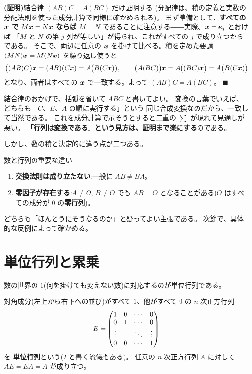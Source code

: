 \noindent\textbf{(証明)}\quad 結合律 $(AB)C = A(BC)$ だけ証明する
(分配律は、積の定義と実数の分配法則を使った成分計算で同様に確かめられる)。
まず準備として、\textbf{すべての $\bm{x}$ で $M\bm{x} = N\bm{x}$ ならば
$M = N$} であることに注意する――実際、$\bm{x} = \bm{e}_j$ とおけば
「$M$ と $N$ の第 $j$ 列が等しい」が得られ、これがすべての $j$ で成り立つからである。
そこで、両辺に任意の $\bm{x}$ を掛けて比べる。積を定めた要請
$(MN)\bm{x} = M(N\bm{x})$ を繰り返し使うと
\[
\bigl((AB)C\bigr)\bm{x} = (AB)(C\bm{x}) = A\bigl(B(C\bm{x})\bigr),
\qquad
\bigl(A(BC)\bigr)\bm{x} = A\bigl((BC)\bm{x}\bigr) = A\bigl(B(C\bm{x})\bigr)
\]
となり、両者はすべての $\bm{x}$ で一致する。よって $(AB)C = A(BC)$。 $\blacksquare$

結合律のおかげで、括弧を省いて $ABC$ と書いてよい。
変換の言葉でいえば、どちらも「$C$、$B$、$A$ の順に実行する」という
同じ合成変換なのだから、一致して当然である。
これを成分計算で示そうとすると二重の $\sum$ が現れて見通しが悪い。
\textbf{「行列は変換である」という見方は、証明まで楽にする}のである。

しかし、数の積と決定的に違う点が二つある。

\begin{itembox}[l]{数と行列の重要な違い}
\begin{enumerate}
\item \textbf{交換法則は成り立たない}:一般に $AB \neq BA$。
\item \textbf{零因子が存在する}:$A \neq O$, $B \neq O$ でも $AB = O$
となることがある($O$ はすべての成分が $0$ の\textbf{零行列})。
\end{enumerate}
\end{itembox}

どちらも「ほんとうにそうなるのか」と疑ってよい主張である。
次節で、具体的な反例によって確かめる。

\section{単位行列と累乗}

数の世界の $1$(何を掛けても変えない数)に対応するのが単位行列である。

\begin{teigi}[単位行列]
対角成分(左上から右下への並び)がすべて $1$、他がすべて $0$ の
$n$ 次正方行列
\[
E = \begin{pmatrix}1 & 0 & \cdots & 0 \\ 0 & 1 & \cdots & 0 \\
\vdots & & \ddots & \vdots \\ 0 & 0 & \cdots & 1\end{pmatrix}
\]
を \textbf{単位行列}という($I$ と書く流儀もある)。
任意の $n$ 次正方行列 $A$ に対して $AE = EA = A$ が成り立つ。
\end{teigi}

